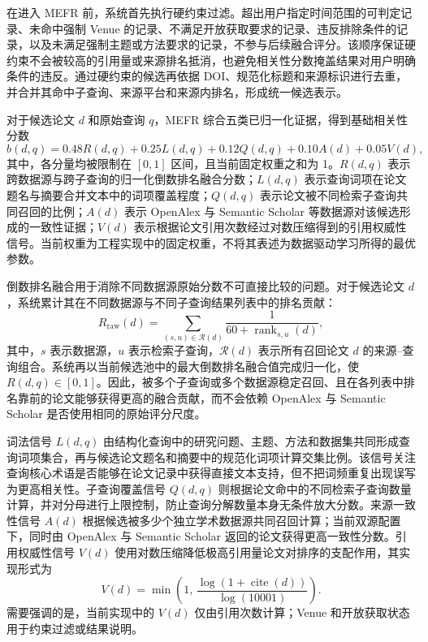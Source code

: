 \documentclass[a4paper,12pt,fontset=none]{ctexart}
\begin{document}
在进入 MEFR 前，系统首先执行硬约束过滤。超出用户指定时间范围的可判定记录、未命中强制 Venue 的记录、不满足开放获取要求的记录、违反排除条件的记录，以及未满足强制主题或方法要求的记录，不参与后续融合评分。该顺序保证硬约束不会被较高的引用量或来源排名抵消，也避免相关性分数掩盖结果对用户明确条件的违反。通过硬约束的候选再依据 DOI、规范化标题和来源标识进行去重，并合并其命中子查询、来源平台和来源内排名，形成统一候选表示。

对于候选论文 $d$ 和原始查询 $q$，MEFR 综合五类已归一化证据，得到基础相关性分数
\begin{equation}
	b(d,q)
	=
	0.48R(d,q)
	+
	0.25L(d,q)
	+
	0.12Q(d,q)
	+
	0.10A(d)
	+
	0.05V(d),
	\label{eq:mefr}
\end{equation}
其中，各分量均被限制在 $[0,1]$ 区间，且当前固定权重之和为 1。$R(d,q)$ 表示跨数据源与跨子查询的归一化倒数排名融合分数；$L(d,q)$ 表示查询词项在论文题名与摘要合并文本中的词项覆盖程度；$Q(d,q)$ 表示论文被不同检索子查询共同召回的比例；$A(d)$ 表示 OpenAlex 与 Semantic Scholar 等数据源对该候选形成的一致性证据；$V(d)$ 表示根据论文引用次数经过对数压缩得到的引用权威性信号。当前权重为工程实现中的固定权重，不将其表述为数据驱动学习所得的最优参数。

倒数排名融合用于消除不同数据源原始分数不可直接比较的问题。对于候选论文 $d$，系统累计其在不同数据源与不同子查询结果列表中的排名贡献：
\begin{equation}
	R_{\mathrm{raw}}(d)
	=
	\sum_{(s,u)\in\mathcal{R}(d)}
	\frac{1}{60+\operatorname{rank}_{s,u}(d)},
\end{equation}
其中，$s$ 表示数据源，$u$ 表示检索子查询，$\mathcal{R}(d)$ 表示所有召回论文 $d$ 的来源--查询组合。系统再以当前候选池中的最大倒数排名融合值完成归一化，使 $R(d,q)\in[0,1]$。因此，被多个子查询或多个数据源稳定召回、且在各列表中排名靠前的论文能够获得更高的融合贡献，而不会依赖 OpenAlex 与 Semantic Scholar 是否使用相同的原始评分尺度。

词法信号 $L(d,q)$ 由结构化查询中的研究问题、主题、方法和数据集共同形成查询词项集合，再与候选论文题名和摘要中的规范化词项计算交集比例。该信号关注查询核心术语是否能够在论文记录中获得直接文本支持，但不把词频重复出现误写为更高相关性。子查询覆盖信号 $Q(d,q)$ 则根据论文命中的不同检索子查询数量计算，并对分母进行上限控制，防止查询分解数量本身无条件放大分数。来源一致性信号 $A(d)$ 根据候选被多少个独立学术数据源共同召回计算；当前双源配置下，同时由 OpenAlex 与 Semantic Scholar 返回的论文获得更高一致性分数。引用权威性信号 $V(d)$ 使用对数压缩降低极高引用量论文对排序的支配作用，其实现形式为
\begin{equation}
	V(d)
	=
	\min\left(
	1,\,
	\frac{\log\!\left(1+\operatorname{cite}(d)\right)}
	{\log(10001)}
	\right).
\end{equation}
需要强调的是，当前实现中的 $V(d)$ 仅由引用次数计算；Venue 和开放获取状态用于约束过滤或结果说明。
\end{document}
